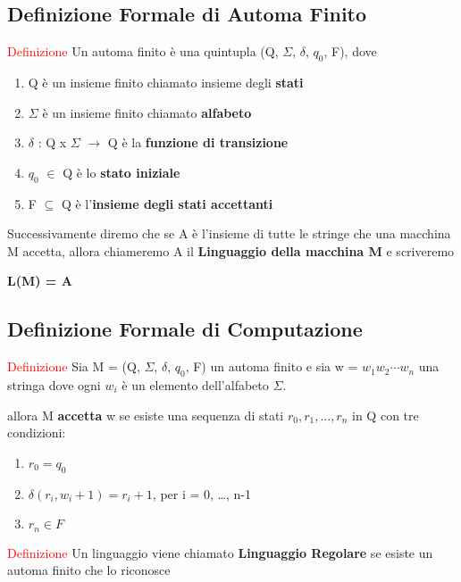 \documentclass{article}
\begin{document}
\subsection{Definizione Formale di Automa Finito}

\textcolor{red}{Definizione}
Un automa finito è una quintupla (Q, $\Sigma$, $\delta$, $q_0$, F), dove
\begin{enumerate}
    \item Q è un insieme finito chiamato insieme degli \textbf{stati}
    \item $\Sigma$ è un insieme finito chiamato \textbf{alfabeto}
    \item $\delta$ : Q x $\Sigma$ $\rightarrow$ Q è la \textbf{funzione di
    transizione}
    \item $q_0$ $\in$ Q è lo \textbf{stato iniziale}
    \item F $\subseteq$ Q è l'\textbf{insieme degli stati accettanti}
\end{enumerate}

Successivamente diremo che se A è l'insieme di tutte le stringe che una macchina
M accetta, allora chiameremo A il \textbf{Linguaggio della macchina M} e
scriveremo

\begin{center}
    \textbf{L(M) = A}
\end{center}

\subsection{Definizione Formale di Computazione}

\textcolor{red}{Definizione}
Sia M = (Q, $\Sigma$, $\delta$, $q_0$, F) un automa finito e sia w = $w_1w_2
\cdots w_n$ una stringa dove ogni $w_i$ è un elemento dell'alfabeto $\Sigma$.

allora M \textbf{accetta} w se esiste una sequenza di stati $r_0, r_1, ..., r_n$
in Q con tre condizioni:

\begin{enumerate}
    \item $r_0 = q_0$
    \item $\delta (r_i, w_i+1) = r_i+1$, per i = 0, \ldots, n-1
    \item $r_n \in F$
\end{enumerate}

\textcolor{red}{Definizione}
Un linguaggio viene chiamato \textbf{Linguaggio Regolare} se esiste un automa
finito che lo riconosce
\end{document}

